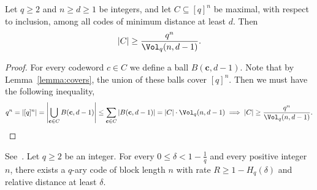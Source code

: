 \begin{lemma}
\label{lemma:MaximalPacking}
\leanok
{}
Let $q \geq 2$ and $n \geq d \geq 1$ be integers, and let $C \subseteq [q]^n$ be
maximal, with respect to inclusion, among all codes of minimum distance at
least $d$.
Then
\[
  |C| \geq \frac{q^n}{\Vol_q(n,d-1)}.
\]
\end{lemma}

\begin{proof}
  \leanok
  For every codeword $c \in C$ we define a ball $B(\mathbf{c},d-1)$.
  Note that by Lemma~\ref{lemma:covers}, the union of these balls cover $[q]^{n}$.
  Then we must have the following inequality,
  \[
  q^{n} =
  |[q]^{n}| = 
  \left|\bigcup_{\mathbf{c} \in C}B(\mathbf{c}, d-1)\right| \leq
  \sum_{\mathbf{c} \in C} |B(\mathbf{c},d-1)| =
  |C| \cdot \Vol_{q}(n,d-1) \implies
  |C| \geq \frac{q^{n}}{\Vol_{q}(n,d-1)}.
  \]
\end{proof}

\begin{theorem}
\label{thm:GVBgc}
\leanok
{}
See~\cite{GRS}.
Let $q \geq 2$ be an integer.
For every $0 \leq \delta < 1 - \frac{1}{q}$ and every positive integer $n$, there exists a $q$-ary code of block length $n$ with rate $R \geq 1 - H_q(\delta)$ and relative distance at least $\delta$.
\end{theorem}

